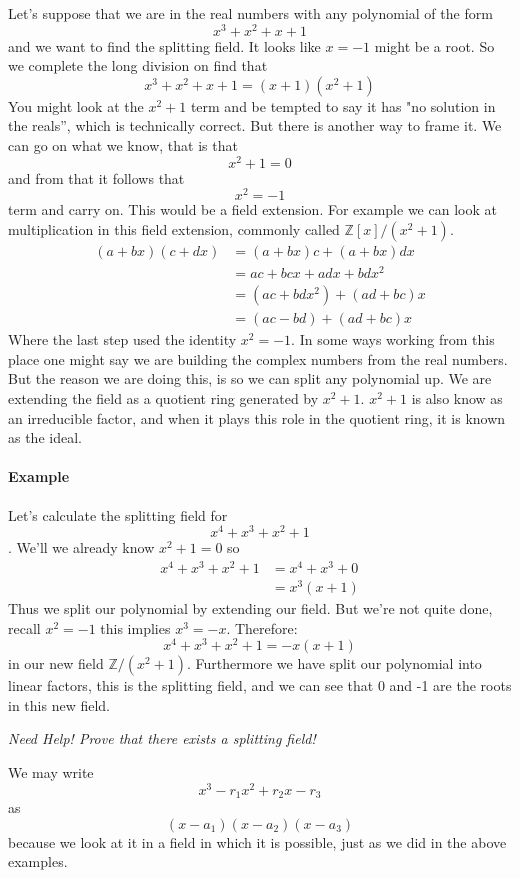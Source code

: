 \documentclass[12pt]{article}
\begin{document}
Let's suppose that we are in the real numbers with any polynomial of the form $$x^3+x^2+x+1$$ and we want to find the splitting field.  It looks like $x=-1$ might be a root. So we complete the long division on find that
$$x^3+x^2+x+1 = (x+1)(x^2+1)$$ 
You might look at the $x^2+1$ term and be tempted to say it has "no solution in the reals'', which is technically correct.  But there is another way to frame it.  We can go on what we know, that is that $$x^2+1=0$$ and from that it follows that $$x^2=-1$$ term and carry on.  This would be a field extension.  For example we can look at multiplication in this field extension, commonly called $\mathbb{Z}[x]/(x^2+1)$.
\begin{align*}
(a+bx)(c+dx) & = (a+bx)c + (a+bx)dx \\
&= ac + bcx + adx +bdx^2 \\
&= (ac+bdx^2) + (ad + bc)x \\
&= (ac-bd) + (ad + bc)x
\end{align*}
Where the last step used the identity $x^2=-1$.  In some ways working from this place one might say we are building the complex numbers from the real numbers.  But the reason we are doing this, is so we can split any polynomial up.  We are extending the field as a quotient ring generated by $x^2+1$.  $x^2+1$ is also know as an irreducible factor, and when it plays this role in the quotient ring, it is known as the ideal.

\paragraph*{Example} Let's calculate the splitting field for $$x^4+x^3+x^2+1$$.  We'll we already know $x^2+1=0$ so
\begin{align*}
x^4+x^3+x^2+1 &= x^4 + x^3 + 0 \\
&= x^3(x+1)
\end{align*}
Thus we split our polynomial by extending our field.  But we're not quite done, recall $x^2=-1$ this implies $x^3 = -x$.  Therefore:
$$x^4+x^3+x^2+1 = -x(x+1)$$ in our new field $\mathbb{Z}/(x^2+1)$.  Furthermore we have split our polynomial into linear factors, this is the splitting field, and we can see that 0 and -1 are the roots in this new field.

\emph{Need Help! Prove that there exists a splitting field!}


We may write $$x^3 -r_1 x^2 +r_2 x - r_3$$ as $$(x-a_1)(x-a_2)(x-a_3)$$  because we look at it in a field in which it is possible, just as we did in the above examples. 
\end{document}
